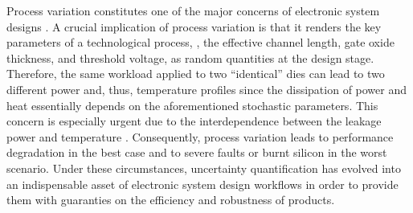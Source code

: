 Process variation constitutes one of the major concerns of electronic system designs \cite{srivastava2010}.
A crucial implication of process variation is that it renders the key parameters of a technological process, \eg, the effective channel length, gate oxide thickness, and threshold voltage, as random quantities at the design stage.
Therefore, the same workload applied to two ``identical'' dies can lead to two different power and, thus, temperature profiles since the dissipation of power and heat essentially depends on the aforementioned stochastic parameters.
This concern is especially urgent due to the interdependence between the leakage power and temperature \cite{liu2007}.
Consequently, process variation leads to performance degradation in the best case and to severe faults or burnt silicon in the worst scenario.
Under these circumstances, uncertainty quantification \cite{maitre2010} has evolved into an indispensable asset of electronic system design workflows in order to provide them with guaranties on the efficiency and robustness of products.
